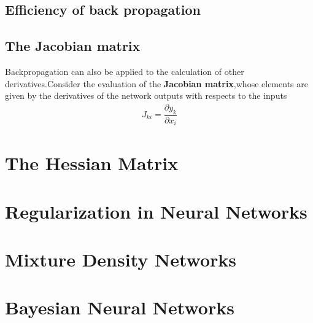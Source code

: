 \subsection{Efficiency of back propagation}

\subsection{The Jacobian matrix}
Backpropagation can also be applied to the calculation of other derivatives.Consider the evaluation of the \textbf{Jacobian matrix},whose elements are given by the derivatives of the network outputs with respects to the inputs
\begin{align}
J_{ki}=\dfrac{\partial y_k}{\partial x_i}
\end{align}



\section{The Hessian Matrix}

\section{Regularization in Neural Networks}










\section{Mixture Density Networks}

\section{Bayesian Neural Networks}